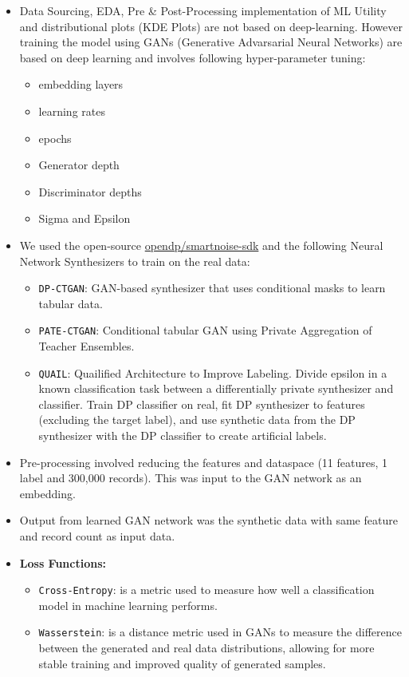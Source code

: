 \documentclass[10pt,twocolumn,letterpaper]{article}
\begin{document}
\begin{itemize}
    \item Data Sourcing, EDA, Pre \& Post-Processing implementation of ML Utility and distributional plots (KDE Plots) are not based on deep-learning. However training the model using GANs (Generative Advarsarial Neural Networks) are based on deep learning and involves following hyper-parameter tuning:
    \begin{itemize}
        \item embedding layers
        \item learning rates
        \item epochs
        \item Generator depth
        \item Discriminator depths
        \item Sigma and Epsilon
    \end{itemize}


    \item
    We used the open-source \href{https://github.com/opendp/smartnoise-sdk}{opendp/smartnoise-sdk} and the following Neural Network Synthesizers to train on the real data:

    \begin{itemize}
        \item \verb'DP-CTGAN': GAN-based synthesizer that uses conditional masks to learn tabular data.

        \item \verb'PATE-CTGAN': Conditional tabular GAN using Private Aggregation of Teacher Ensembles.

        \item \verb'QUAIL': Quailified Architecture to Improve Labeling. Divide epsilon in a known classification task between a differentially private synthesizer and classifier. Train DP classifier on real, fit DP synthesizer to features (excluding the target label), and use synthetic data from the DP synthesizer with the DP classifier to create artificial labels.

    \end{itemize}

    \item Pre-processing involved reducing the features and dataspace (11 features, 1 label and 300,000 records). This was input to the GAN network as an embedding.
    \item Output from learned GAN network was the synthetic data with same feature and record count as input data.
    \item \textbf{Loss Functions:}
    \begin{itemize}
        \item \verb'Cross-Entropy': is a metric used to measure how well a classification model in machine learning performs.
        \item \verb'Wasserstein': is a distance metric used in GANs to measure the difference between the generated and real data distributions, allowing for more stable training and improved quality of generated samples.
    \end{itemize}


\end{itemize}
\end{document}
